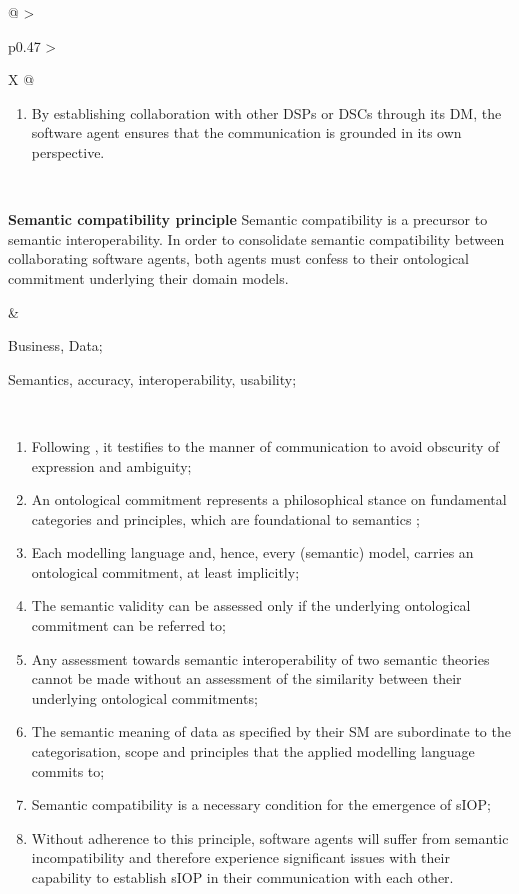 \begin{xltabular}[l]{\linewidth}{@{} >{\small\raggedright\arraybackslash}p{0.47\linewidth} >{\small\raggedright\arraybackslash}X @{}}
\begin{enumerate}[left=10pt, nosep]
  \item By establishing collaboration with other DSPs or DSCs through its DM, the software agent ensures that the communication is grounded in its own perspective.
\end{enumerate} \\
%
%
%
\begin{mmdp}\label{dp:scp}{\bfseries Semantic compatibility principle}
\quad Semantic compatibility is a precursor to semantic interoperability. In order to consolidate semantic compatibility between collaborating software agents, both agents must confess to their ontological commitment underlying their domain models.\end{mmdp} 
&
\begin{description}[labelwidth=3.7cm,leftmargin=3.7cm+1ex,nosep,topsep=2ex,labelsep=1ex,font=\bfseries]
\item[Type of information:] Business, Data;
\item[Quality attributes:] Semantics, accuracy, interoperability, usability;
\end{description} \\
\begin{enumerate}[left=6pt, nosep]
  \item Following \cite{Grice:1991BT}, it testifies to the manner of communication to avoid obscurity of expression and ambiguity;
  \item An ontological commitment represents a philosophical stance on fundamental categories and principles, which are foundational to semantics \cite[sec.3.1]{Brandt2021a};
  \item Each modelling language and, hence, every (semantic) model, carries an ontological commitment, at least implicitly;
  \item The semantic validity can be assessed only if the underlying ontological commitment can be referred to;
  \item Any assessment towards semantic interoperability of two semantic theories cannot be made without an assessment of the similarity between their underlying ontological commitments;
  \item The semantic meaning of data as specified by their SM are subordinate to the categorisation, scope and principles that the applied modelling language commits to; 
  \item Semantic compatibility is a necessary condition for the emergence of sIOP; 
  \item Without adherence to this principle, software agents will suffer from semantic incompatibility and therefore experience significant issues with their capability to establish sIOP in their communication with each other.

\end{enumerate}
\end{xltabular}
